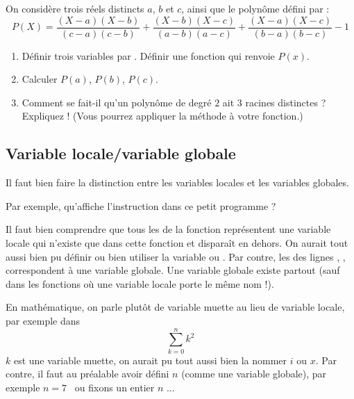 \documentclass[class=report,crop=false]{standalone}
\begin{document}
\begin{tp}
On considère trois réels distincts $a$, $b$ et $c$, ainsi que le polynôme défini par :
$$P(X) = \frac{(X-a)(X-b)}{(c-a)(c-b)}+\frac{(X-b)(X-c)}{(a-b)(a-c)}
+  \frac{(X-a)(X-c)}{(b-a)(b-c)}-1$$
\begin{enumerate}
  \item Définir trois variables par .
  Définir une fonction  qui renvoie $P(x)$.
  
  \item Calculer $P(a)$, $P(b)$, $P(c)$.
  
  \item Comment se fait-il qu'un polynôme de degré $2$ ait $3$ racines distinctes ?
  Expliquez ! (Vous pourrez appliquer la méthode  à votre fonction.)
\end{enumerate}
  
\end{tp}


\subsection{Variable locale/variable globale}

Il faut bien faire la distinction entre les variables locales et les variables globales.

Par exemple, qu'affiche l'instruction  dans ce petit programme ?


Il faut bien comprendre que tous les  de la fonction
représentent une variable locale qui n'existe que dans cette fonction et disparaît 
en dehors. On aurait tout aussi bien pu définir
ou bien utiliser la variable  ou .
Par contre, les  des lignes
, , 
correspondent à une variable globale.
Une variable globale existe partout (sauf dans les fonctions où une variable
locale porte le même nom !).


En mathématique, on parle plutôt de variable muette au lieu de variable locale, par exemple
dans 
$$\sum_{k=0}^n k^2$$
$k$ est une variable muette, on aurait pu tout aussi bien la nommer $i$ ou $x$.
Par contre, il faut au préalable avoir défini $n$ (comme une variable globale), par exemple
\og $n=7$ \fg\ ou \og fixons un entier $n$ \fg...
\end{document}

